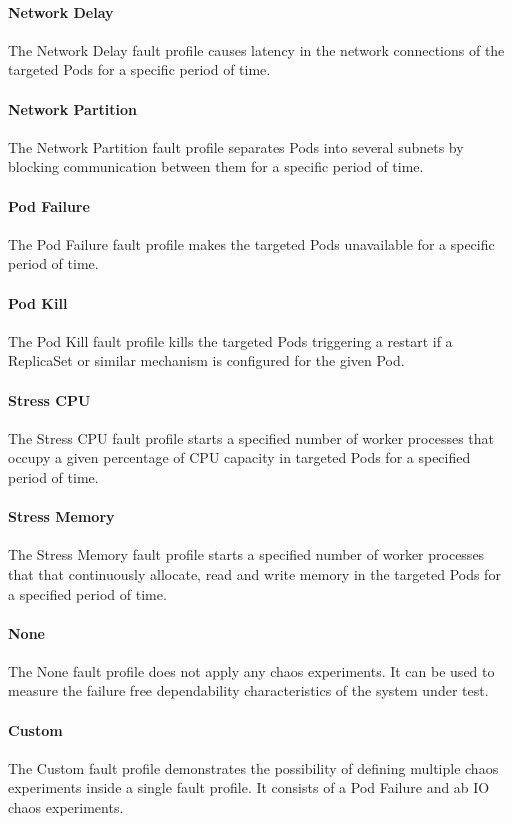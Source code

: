 \paragraph{Network Delay} The Network Delay fault profile causes latency in the network connections of the targeted Pods for a specific period of time.

\paragraph{Network Partition} The Network Partition fault profile separates Pods into several subnets by blocking communication between them for a specific period of time.

\paragraph{Pod Failure} The Pod Failure fault profile makes the targeted Pods unavailable for a specific period of time.

\paragraph{Pod Kill} The Pod Kill fault profile kills the targeted Pods triggering a restart if a ReplicaSet or similar mechanism is configured for the given Pod.

\paragraph{Stress CPU} The Stress CPU fault profile starts a specified number of worker processes that occupy a given percentage of CPU capacity in targeted Pods for a specified period of time.

\paragraph{Stress Memory} The Stress Memory fault profile starts a specified number of worker processes that that continuously allocate, read and write memory in the targeted Pods for a specified period of time.

\paragraph{None} The None fault profile does not apply any chaos experiments. It can be used to measure the failure free dependability characteristics of the system under test.

\paragraph{Custom} The Custom fault profile demonstrates the possibility of defining multiple chaos experiments inside a single fault profile. It consists of a Pod Failure and ab IO chaos experiments.

